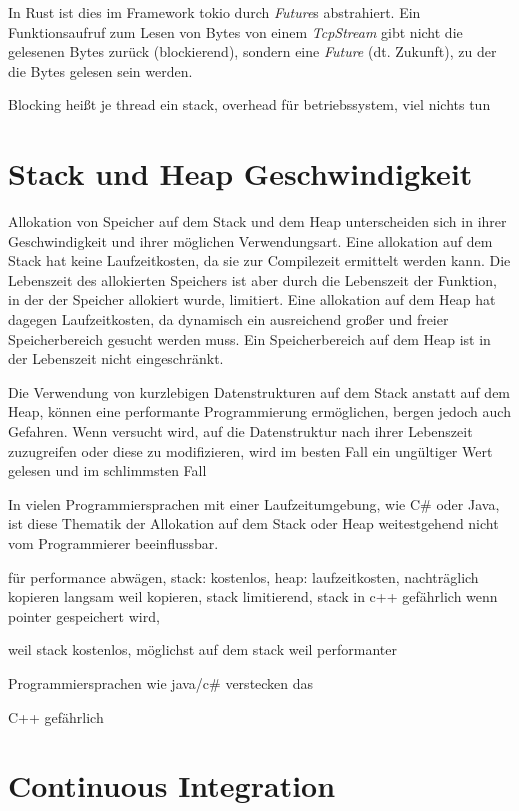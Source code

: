 In Rust ist dies im Framework tokio durch \textit{Future}s abstrahiert. Ein Funktionsaufruf zum Lesen von Bytes von einem \textit{TcpStream} gibt nicht die gelesenen Bytes zurück (blockierend), sondern eine \textit{Future} (dt. Zukunft), zu der die Bytes gelesen sein werden.




\cite[303]{realtime}

Blocking heißt je thread ein stack, overhead für betriebssystem, viel nichts tun


\section{Stack und Heap Geschwindigkeit}


Allokation von Speicher auf dem Stack und dem Heap unterscheiden sich in ihrer Geschwindigkeit und ihrer möglichen Verwendungsart.
Eine allokation auf dem Stack hat keine Laufzeitkosten, da sie zur Compilezeit ermittelt werden kann.
Die Lebenszeit des allokierten Speichers ist aber durch die Lebenszeit der Funktion, in der der Speicher allokiert wurde, limitiert.
Eine allokation auf dem Heap hat dagegen Laufzeitkosten, da dynamisch ein ausreichend großer und freier Speicherbereich gesucht werden muss.
Ein Speicherbereich auf dem Heap ist in der Lebenszeit nicht eingeschränkt.

Die Verwendung von kurzlebigen Datenstrukturen auf dem Stack anstatt auf dem Heap, können eine performante Programmierung ermöglichen, bergen jedoch auch Gefahren.
Wenn versucht wird, auf die Datenstruktur nach ihrer Lebenszeit zuzugreifen oder diese zu modifizieren, wird im besten Fall ein ungültiger Wert gelesen und im schlimmsten Fall 



In vielen Programmiersprachen mit einer Laufzeitumgebung, wie C\# oder Java, ist diese Thematik der Allokation auf dem Stack oder Heap weitestgehend nicht vom Programmierer beeinflussbar.



für performance abwägen,
stack: kostenlos,
heap: laufzeitkosten,
nachträglich kopieren langsam weil kopieren,
stack limitierend,
stack in c++ gefährlich wenn pointer gespeichert wird,

weil stack kostenlos, möglichst auf dem stack weil performanter

Programmiersprachen wie java/c\# verstecken das

C++ gefährlich

\section{Continuous Integration}

